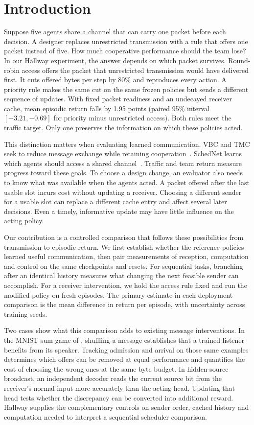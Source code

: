 \documentclass[a4paper,fleqn]{cas-dc}
\begin{document}
\section{Introduction}
Suppose five agents share a channel that can carry one packet before each decision. A designer replaces unrestricted transmission with a rule that offers one packet instead of five. How much cooperative performance should the team lose? In our Hallway experiment, the answer depends on which packet survives. Round-robin access offers the packet that unrestricted transmission would have delivered first. It cuts offered bytes per step by 80\% and reproduces every action. A priority rule makes the same cut on the same frozen policies but sends a different sequence of updates. With fixed packet readiness and an undecayed receiver cache, mean episodic return falls by 1.95 points (paired 95\% interval $[-3.21,-0.69]$ for priority minus unrestricted access). Both rules meet the traffic target. Only one preserves the information on which these policies acted.

This distinction matters when evaluating learned communication. VBC and TMC seek to reduce message exchange while retaining cooperation~\citep{zhang2019efficient,zhang2020succinct}. SchedNet learns which agents should access a shared channel~\citep{kim2019schedule}. Traffic and team return measure progress toward these goals. To choose a design change, an evaluator also needs to know what was available when the agents acted. A packet offered after the last usable slot incurs cost without updating a receiver. Choosing a different sender for a usable slot can replace a different cache entry and affect several later decisions. Even a timely, informative update may have little influence on the acting policy.

Our contribution is a controlled comparison that follows these possibilities from transmission to episodic return. We first establish whether the reference policies learned useful communication, then pair measurements of reception, computation and control on the same checkpoints and resets. For sequential tasks, branching after an identical history measures what changing the next feasible sender can accomplish. For a receiver intervention, we hold the access rule fixed and run the modified policy on fresh episodes. The primary estimate in each deployment comparison is the mean difference in return per episode, with uncertainty across training seeds.

Two cases show what this comparison adds to existing message interventions. In the MNIST-sum game of \citet{eccles2019biases}, shuffling a message establishes that a trained listener benefits from its speaker. Tracking admission and arrival on those same examples determines which offers can be removed at equal performance and quantifies the cost of choosing the wrong ones at the same byte budget. In hidden-source broadcast, an independent decoder reads the current source bit from the receiver's normal input more accurately than the acting head. Updating that head tests whether the discrepancy can be converted into additional reward. Hallway supplies the complementary controls on sender order, cached history and computation needed to interpret a sequential scheduler comparison.
\end{document}
